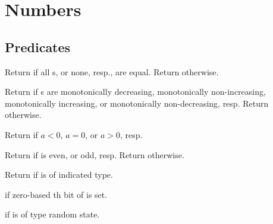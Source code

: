 \section{Numbers} 

\subsection{Predicates} 

\begin{LIST}{1cm}

  \index{=}%
  \index{/=}%
  Return \retval{\T} if all s, or
  none, resp.,  are equal. Return \retval{\NIL} otherwise.

  Return \retval{\T} if s are
  monotonically decreasing, monotonically non-increasing, monotonically
  increasing, or monotonically non-decreasing, resp. Return
  \retval{\NIL} otherwise.

  Return \retval{\T} if $a < 0$, $a = 0$, or $a > 0$, resp.

   Return \retval{\T}
  if  is even, or odd, resp. Return \retval{\NIL} otherwise.

  Return \retval{\T} if  is of
  indicated type.

  \retval{\T} if zero-based th bit of  is set.

  \retval{\T} if  is of type random state.

\end{LIST}

